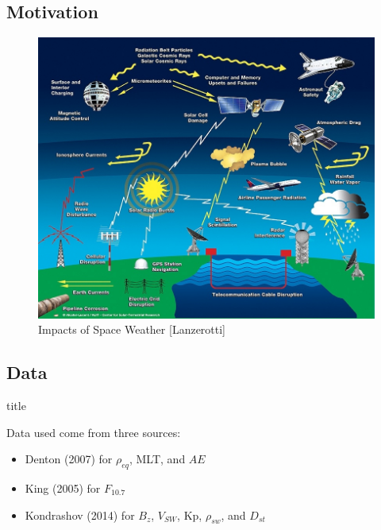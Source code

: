 \documentclass[xcolor={dvipsnames,table}]{beamer}
\newcommand{\subheader}{    		\begin{center}
  	\begin{beamercolorbox}[sep=4pt,center,shadow=true,rounded=true]{title}
  		\usebeamerfont{title}\subsecname\par%
  	\end{beamercolorbox}
  	\vfill
  	\end{center}}
\newcommand{\req}{\ensuremath{\rho_{eq}}} %
\newcommand{\f}{\ensuremath{F_{10.7}}} %
\begin{document}
\subsection{Motivation}
\begin{frame}
	\begin{figure}
		\centering
		\includegraphics[width=0.75\linewidth]{Figures/TE_space_weather_diagram}
		\caption{Impacts of Space Weather [Lanzerotti]}
		\label{fig:TE_space_weather_diagram}
	\end{figure}
\end{frame}




\subsection{Data}

\begin{frame}
	\subheader
	Data used come from three sources:
	\small
	\begin{itemize}
		\item Denton (2007) for \req, MLT, and $AE$ \\
		\item King (2005) for \f
		\item Kondrashov (2014) for $B_z$, $V_{SW}$, Kp, $\rho_{sw}$, and $D_{st}$ \\
	\end{itemize}
\end{frame}
\end{document}
